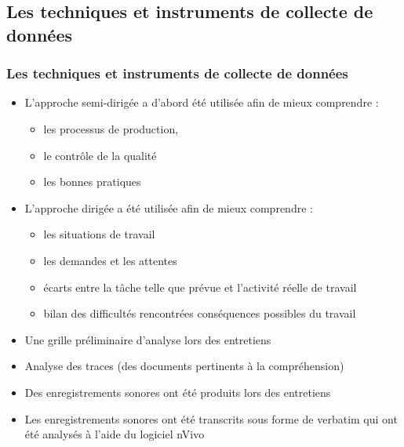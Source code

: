                       		 \subsection{Les techniques et instruments de collecte de données} 
					\begin{frame}[allowframebreaks]
						\frametitle{Les techniques et instruments de collecte de données}
                        
                        			\begin{itemize} 
                       				\item L’approche semi-dirigée a d’abord été utilisée afin de mieux comprendre :
                       				\begin{itemize}
                       				 	\item les processus de production, 
                       				 	\item le contrôle de la qualité 
                       				 	\item les bonnes pratiques 
                       				 \end{itemize}
                       				\item L’approche dirigée a été utilisée afin de mieux comprendre :
                       				\begin{itemize}
                       					\item les situations de travail 
                       					\item les demandes et les attentes
                       					\item écarts entre la tâche telle que prévue et l’activité réelle de travail
                       					\item bilan des difficultés rencontrées conséquences possibles du travail 
							\end{itemize}
							\item Une grille préliminaire d’analyse lors des entretiens
							\item Analyse des traces (des documents pertinents à la compréhension)
							\item Des enregistrements sonores ont été produits lors des entretiens
							\item Les enregistrements sonores ont été transcrits sous forme de verbatim qui ont été analysés à l’aide du logiciel nVivo
                       		 	\end{itemize}
                       		           
                			\end{frame}
                
